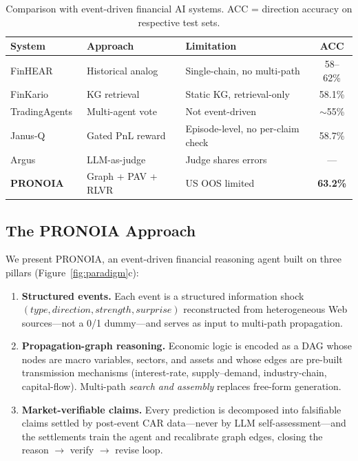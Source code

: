\documentclass[sigconf, anonymous, review]{acmart}
\begin{document}
\begin{table}[t]
\centering\footnotesize
\caption{Comparison with event-driven financial AI systems. ACC = direction accuracy on respective test sets.}
\label{tab:comparison}
\setlength{\tabcolsep}{3pt}
\begin{tabular}{@{}p{1.75cm}p{1.75cm}p{3.15cm}c@{}}
\toprule
System & Approach & Limitation & ACC \\
\midrule
FinHEAR~\cite{finhear2025} & Historical analog & Single-chain, no multi-path & 58--62\% \\
FinKario~\cite{finkario2025} & KG retrieval & Static KG, retrieval-only & 58.1\% \\
Trading\-Agents~\cite{tradingagents2024} & Multi-agent vote & Not event-driven & $\sim$55\% \\
Janus-Q~\cite{janusq2026} & Gated PnL reward & Episode-level, no per-claim check & 58.7\% \\
Argus~\cite{argus2026} & LLM-as-judge & Judge shares errors & --- \\
\midrule
\textbf{PRONOIA} & Graph + PAV + RLVR & US OOS limited & \textbf{63.2\%} \\
\bottomrule
\end{tabular}
\end{table}

\subsection{The PRONOIA Approach}

We present PRONOIA, an event-driven financial reasoning agent built on three pillars (Figure~\ref{fig:paradigm}c):

\begin{enumerate}
    \item \textbf{Structured events.} Each event is a structured information shock $(type, direction, strength, surprise)$ reconstructed from heterogeneous Web sources---not a 0/1 dummy---and serves as input to multi-path propagation.
    \item \textbf{Propagation-graph reasoning.} Economic logic is encoded as a DAG whose nodes are macro variables, sectors, and assets and whose edges are pre-built transmission mechanisms (interest-rate, supply--demand, industry-chain, capital-flow). Multi-path \emph{search and assembly} replaces free-form generation.
    \item \textbf{Market-verifiable claims.} Every prediction is decomposed into falsifiable claims settled by post-event CAR data---never by LLM self-assessment---and the settlements train the agent and recalibrate graph edges, closing the reason $\to$ verify $\to$ revise loop.
\end{enumerate}
\end{document}
